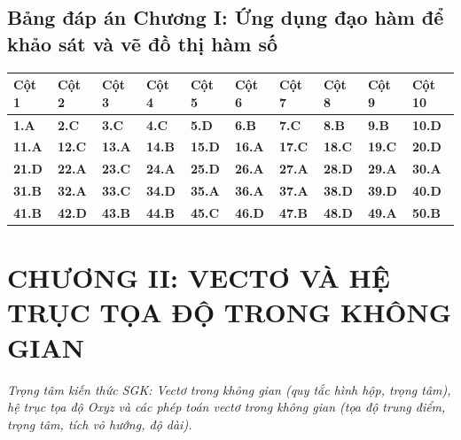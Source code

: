 \documentclass[11pt,a4paper]{article}
\begin{document}
\subsection*{\color{primary} Bảng đáp án Chương I: Ứng dụng đạo hàm để khảo sát và vẽ đồ thị hàm số}
\begin{center}
\renewcommand{\arraystretch}{1.25}
\begin{tabularx}{\textwidth}{*{10}{>{\centering\arraybackslash}X}}
\toprule
\textbf{\color{primary} Cột 1} & \textbf{\color{primary} Cột 2} & \textbf{\color{primary} Cột 3} & \textbf{\color{primary} Cột 4} & \textbf{\color{primary} Cột 5} & \textbf{\color{primary} Cột 6} & \textbf{\color{primary} Cột 7} & \textbf{\color{primary} Cột 8} & \textbf{\color{primary} Cột 9} & \textbf{\color{primary} Cột 10} \\
\midrule
\textbf{1.A} & \textbf{2.C} & \textbf{3.C} & \textbf{4.C} & \textbf{5.D} & \textbf{6.B} & \textbf{7.C} & \textbf{8.B} & \textbf{9.B} & \textbf{10.D} \\
\rowcolor{rowtint} \textbf{11.A} & \textbf{12.C} & \textbf{13.A} & \textbf{14.B} & \textbf{15.D} & \textbf{16.A} & \textbf{17.C} & \textbf{18.C} & \textbf{19.C} & \textbf{20.D} \\
\textbf{21.D} & \textbf{22.A} & \textbf{23.C} & \textbf{24.A} & \textbf{25.D} & \textbf{26.A} & \textbf{27.A} & \textbf{28.D} & \textbf{29.A} & \textbf{30.A} \\
\rowcolor{rowtint} \textbf{31.B} & \textbf{32.A} & \textbf{33.C} & \textbf{34.D} & \textbf{35.A} & \textbf{36.A} & \textbf{37.A} & \textbf{38.D} & \textbf{39.D} & \textbf{40.D} \\
\textbf{41.B} & \textbf{42.D} & \textbf{43.B} & \textbf{44.B} & \textbf{45.C} & \textbf{46.D} & \textbf{47.B} & \textbf{48.D} & \textbf{49.A} & \textbf{50.B} \\
\bottomrule
\end{tabularx}
\end{center}\vspace{10pt}
\section*{\color{primary} CHƯƠNG II: VECTƠ VÀ HỆ TRỤC TỌA ĐỘ TRONG KHÔNG GIAN}
\textit{Trọng tâm kiến thức SGK: Vectơ trong không gian (quy tắc hình hộp, trọng tâm), hệ trục tọa độ Oxyz và các phép toán vectơ trong không gian (tọa độ trung điểm, trọng tâm, tích vô hướng, độ dài).}\par\vspace{4pt}
\end{document}
